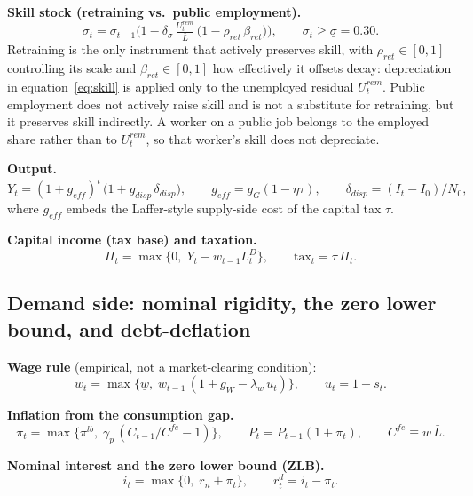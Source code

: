 \documentclass[review,12pt]{elsarticle}
\theoremstyle{plain}
\theoremstyle{definition}
\theoremstyle{remark}
\newcommand{\barL}{\bar{L}}
\begin{document}
\textbf{Skill stock (retraining vs.\ public employment).}
\begin{equation}
\label{eq:skill}
\sigma_t=\sigma_{t-1}\Big(1-\delta_\sigma\,\tfrac{U_t^{rem}}{\barL}\,\big(1-\rho_{ret}\,\beta_{ret}\big)\Big),\qquad
\sigma_t\ge\underline{\sigma}=0.30.
\end{equation}
Retraining is the only instrument that actively preserves skill, with $\rho_{ret}\in[0,1]$ controlling its scale and $\beta_{ret}\in[0,1]$ how effectively it offsets decay: depreciation in equation~\eqref{eq:skill} is applied only to the unemployed residual $U_t^{rem}$. Public employment does not actively raise skill and is not a substitute for retraining, but it preserves skill indirectly. A worker on a public job belongs to the employed share rather than to $U_t^{rem}$, so that worker's skill does not depreciate.

\textbf{Output.}
\begin{equation}
Y_t=(1+g_{eff})^t\,\big(1+g_{disp}\,\delta_{disp}\big),\qquad
g_{eff}=g_G(1-\eta\tau),\qquad \delta_{disp}=(I_t-I_0)/N_0,
\end{equation}
where $g_{eff}$ embeds the Laffer-style supply-side cost of the capital tax $\tau$.

\textbf{Capital income (tax base) and taxation.}
\begin{equation}
\Pi_t=\max\{0,\;Y_t-w_{t-1}L_t^D\},\qquad \text{tax}_t=\tau\,\Pi_t.
\end{equation}

\subsection{Demand side: nominal rigidity, the zero lower bound, and debt-deflation}
\textbf{Wage rule} (empirical, not a market-clearing condition):
\begin{equation}
w_t=\max\{\underline{w},\;w_{t-1}\,(1+g_W-\lambda_w\,u_t)\},\qquad u_t=1-s_t.
\end{equation}

\textbf{Inflation from the consumption gap.}
\begin{equation}
\pi_t=\max\{\pi^{lb},\;\gamma_p\,(C_{t-1}/C^{fe}-1)\},\qquad P_t=P_{t-1}(1+\pi_t),
\qquad C^{fe}\equiv w\,\barL.
\end{equation}

\textbf{Nominal interest and the zero lower bound (ZLB).}
\begin{equation}
i_t=\max\{0,\;r_n+\pi_t\},\qquad r_t^d=i_t-\pi_t.
\end{equation}
\end{document}
